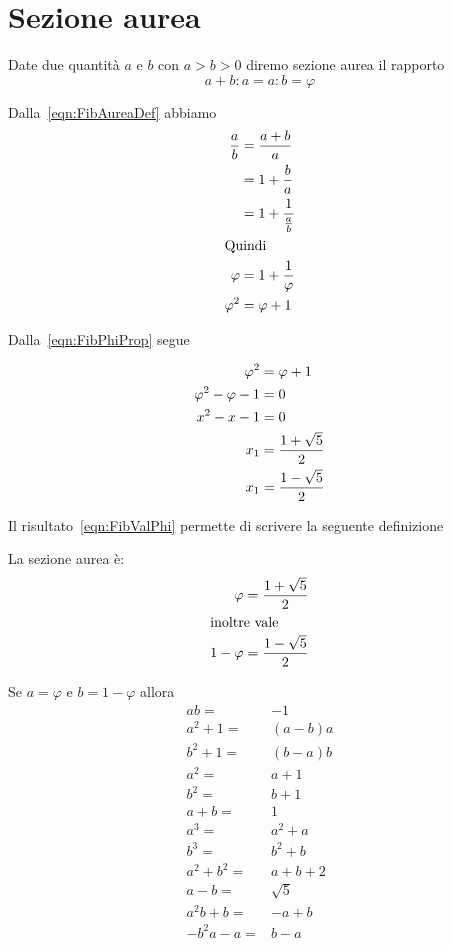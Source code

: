 \section{Sezione aurea}
\begin{defn}
	Date due quantità $a$ e $b$ con $a>b>0$ diremo sezione aurea il rapporto
	\begin{equation}
	a+b:a=a:b=\varphi	
	\end{equation}\label{eqn:FibAureaDef}
\end{defn}
\begin{prop}
	Dalla~\vref{eqn:FibAureaDef} abbiamo
	\begin{align}
		\dfrac{a}{b}={}&\dfrac{a+b}{a}\notag\\
		={}&1+\dfrac{b}{a}\notag\\
		={}&1+\dfrac{1}{\frac{a}{b}}\notag\\
		\intertext{Quindi}
		\varphi={}&1+\dfrac{1}{\varphi}\label{eqn:FibPhiProp}\\
		\varphi^2={}&\varphi+1\notag
	\end{align}
\end{prop}
	Dalla~\vref{eqn:FibPhiProp} segue
	\begin{prop}
	\begin{align}
		\varphi^2={}&\varphi+1\notag\\
		\varphi^2-\varphi-1={}&0\notag\\
		x^2-x-1={}&0\label{eqn:FibValPhiEqua}\\
		x_1={}&\dfrac{1+\sqrt{5}}{2}\label{eqn:FibValPhi}\\
		x_1={}&\dfrac{1-\sqrt{5}}{2}\notag
	\end{align}
\end{prop}
Il risultato~\ref{eqn:FibValPhi} permette di scrivere la seguente definizione
\begin{defn}
La sezione aurea è: 
\begin{align*}
	\varphi={}&\dfrac{1+\sqrt{5}}{2}\\
\intertext{inoltre vale}
	1-	\varphi={}&\dfrac{1-\sqrt{5}}{2}\\
\end{align*}
\end{defn}
\begin{lem}[Proprietà]\label{lem:FibpropPhi}
	Se $a=\varphi$ e  $b=1-\varphi$ allora
	\begin{align*}
		ab={}&-1\\
		a^2+1={}&(a-b)a\\
		b^2+1={}&(b-a)b\\
		a^2={}&a+1\\
		b^2={}&b+1\\
		a+b={}&1\\
		a^3={}&a^2+a\\
		b^3={}&b^2+b\\
		a^2+b^2={}&a+b+2\\
	a-b={}&\sqrt{5}\\
	a^2b+b={}&-a+b\\
	-b^2a-a={}&b-a\\
		\end{align*}
\end{lem}
